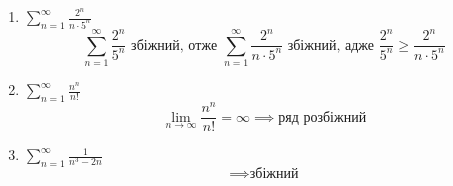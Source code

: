 \documentclass[../rgr_2.tex]{subfiles}
\begin{document}
\Solution

\begin{enumerate}
	\item $\sum_{n=1}^\infty \frac{2^n}{n\cdot5^n}$
	\begin{equation}
		\sum_{n=1}^\infty\frac{2^n}{5^n}
		\text{~збіжний, отже~}
		\sum_{n=1}^\infty\frac{2^n}{n\cdot5^n}
		\text{~збіжний, адже~}
		\frac{2^n}{5^n} \geq
		\frac{2^n}{n\cdot5^n}
	\end{equation}

	\item $\sum_{n=1}^\infty \frac{n^n}{n!}$
	\begin{equation}
		\lim_{n\to\infty}\frac{n^n}{n!}=\infty
		\implies\text{ряд розбіжний}
	\end{equation}

	\item $\sum_{n=1}^\infty \frac{1}{n^3-2n}$
	\begin{dmath}
		\implies\text{збіжний}
	\end{dmath}
\end{enumerate}

\end{document}
